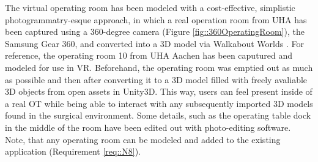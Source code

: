 The virtual operating room has been modeled with a cost-effective, simplistic photogrammatry-esque approach, in which a real operation room from UHA has been captured using a 
360-degree camera (Figure \ref{fig::360OperatingRoom}), the Samsung Gear 360, and converted into a 3D model via Walkabout Worlds \cite{WalkaboutWorlds}.
For reference, the operating room 10 from UHA Aachen has been caputured and modeled for use in VR.
Beforehand, the operating room was emptied out as much as possible and then after converting it to a 3D model filled with freely avaliable 3D objects from open assets in Unity3D.
This way, users can feel present inside of a real OT while being able to interact with any subsequently imported 3D models found in the surgical environment.
Some details, such as the operating table dock in the middle of the room have been edited out with photo-editing software.
Note, that any operating room can be modeled and added to the existing application (Requirement \ref{req::N8}).


